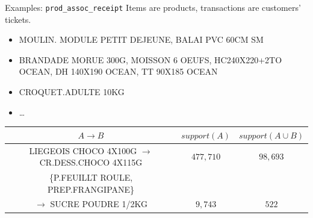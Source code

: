 \documentclass[table]{beamer}
\providecommand{\prodassocreceipt}{\texttt{prod\-\_assoc\-\_receipt} }
\begin{document}
\begin{frame}{Examples: \prodassocreceipt}
  Items are products, transactions are customers' tickets.
  \\\vspace{1em}
  \begin{scriptsize}
  \begin{itemize}
    \item MOULIN. MODULE PETIT DEJEUNE, BALAI PVC 60CM SM
    \item BRANDADE MORUE 300G, MOISSON 6 OEUFS, HC240X220+2TO OCEAN, DH 140X190 OCEAN, TT 90X185 OCEAN
    \item CROQUET.ADULTE 10KG
    \item \ldots
  \end{itemize}
  \vspace{1em}
  \begin{table}
    \centering
    \def\arraystretch{1.2}
    \begin{tabular}{|c|c|c|}
      \hline
      $A \rightarrow B$       & $\mathit{support}(A)$ & $\mathit{support}(A \cup B)$ \\\hline
      LIEGEOIS CHOCO 4X100G $\rightarrow$  CR.DESS.CHOCO 4X115G       & $477,710$ & $98,693$   \\
      \{P.FEUILLT ROULE, PREP.FRANGIPANE\}    &                 &     \\
          $\rightarrow$ SUCRE POUDRE 1/2KG & $9,743$ & $522$  \\
      \hline
    \end{tabular}
  \end{table}
  \end{scriptsize}
\end{frame}
\end{document}
